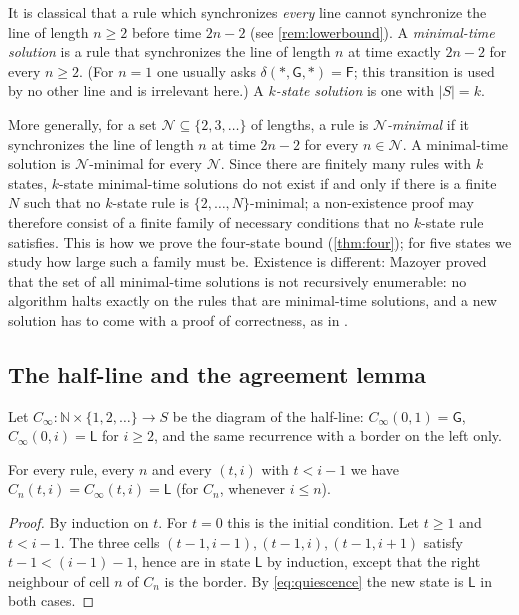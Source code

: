 It is classical \cite{Moore64,Waksman66,Balzer67} that a rule which
synchronizes \emph{every} line cannot synchronize the line of length $n\ge2$
before time $2n-2$ (see \cref{rem:lowerbound}). A \emph{minimal-time
solution} is a rule that synchronizes the line of length $n$ at time exactly
$2n-2$ for every $n\ge2$. (For $n=1$ one
usually asks $\delta(\ast,\mathsf G,\ast)=\mathsf F$; this transition is
used by no other line and is irrelevant here.) A \emph{$k$-state solution} is
one with $|S|=k$.

More generally, for a set $\mathcal N\subseteq\{2,3,\dots\}$ of lengths, a
rule is \emph{$\mathcal N$-minimal} if it synchronizes the line of length $n$
at time $2n-2$ for every $n\in\mathcal N$. A minimal-time solution is
$\mathcal N$-minimal for every $\mathcal N$. Since there are finitely many
rules with $k$ states, $k$-state minimal-time solutions do not exist if and
only if there is a finite $N$ such that no $k$-state rule is
$\{2,\dots,N\}$-minimal; a non-existence proof may therefore consist of a
finite family of necessary conditions that no $k$-state rule satisfies.
This is how we prove the four-state bound (\cref{thm:four}); for five states
we study how large such a family must be. Existence is different: Mazoyer
\cite{Mazoyer96} proved that the set of all minimal-time solutions is not
recursively enumerable: no algorithm halts exactly on the rules that are
minimal-time solutions, and a new solution has to come with a proof of
correctness, as in \cite{Balzer67,Mazoyer87}.

\subsection{The half-line and the agreement lemma}

Let $C_\infty:\mathbb N\times\{1,2,\dots\}\to S$ be the diagram of the
half-line: $C_\infty(0,1)=\mathsf G$, $C_\infty(0,i)=\mathsf L$ for $i\ge2$,
and the same recurrence with a border on the left only.

\begin{lemma}\label{lem:lightcone}
For every rule, every $n$ and every $(t,i)$ with $t<i-1$ we have
$C_n(t,i)=C_\infty(t,i)=\mathsf L$ (for $C_n$, whenever $i\le n$).
\end{lemma}

\begin{proof}
By induction on $t$. For $t=0$ this is the initial condition. Let $t\ge1$
and $t<i-1$. The three cells $(t-1,i-1),(t-1,i),(t-1,i+1)$ satisfy
$t-1<(i-1)-1$, hence are in state $\mathsf L$ by induction, except that the
right neighbour of cell $n$ of $C_n$ is the border. By \eqref{eq:quiescence}
the new state is $\mathsf L$ in both cases.
\end{proof}

